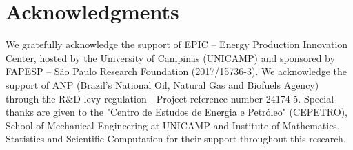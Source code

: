 \section*{Acknowledgments}
\label{sec:acknowledgments}

We gratefully acknowledge the support of EPIC – Energy Production Innovation Center, hosted by the University of Campinas (UNICAMP) and sponsored by FAPESP – São Paulo Research Foundation (2017/15736-3). We acknowledge the support of ANP (Brazil’s National Oil, Natural Gas and Biofuels Agency) through the R\&D levy regulation - Project reference number 24174-5. Special thanks are given to the "Centro de Estudos de Energia e Petróleo" (CEPETRO), School of Mechanical Engineering at UNICAMP and Institute of Mathematics, Statistics and Scientific Computation for their support throughout this research.